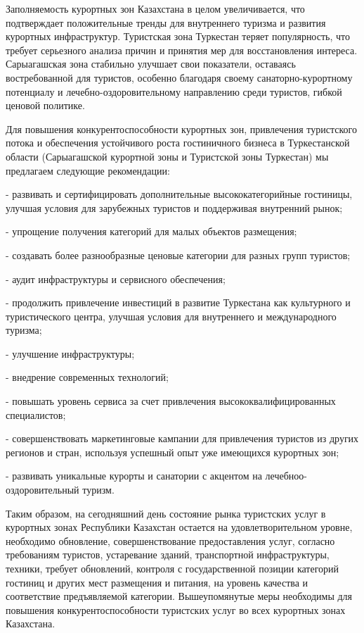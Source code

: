 \begin{multicols}{2}
Заполняемость курортных зон Казахстана в целом увеличивается, что
подтверждает положительные тренды для внутреннего туризма и развития
курортных инфраструктур. Туристская зона Туркестан теряет популярность,
что требует серьезного анализа причин и принятия мер для восстановления
интереса. Сарыагашская зона стабильно улучшает свои показатели,
оставаясь востребованной для туристов, особенно благодаря своему
санаторно-курортному потенциалу и лечебно-оздоровительному направлению
среди туристов, гибкой ценовой политике.

Для повышения конкурентоспособности курортных зон, привлечения
туристского потока и обеспечения устойчивого роста гостиничного бизнеса
в Туркестанской области (Сарыагашской курортной зоны и Туристской зоны
Туркестан) мы предлагаем следующие рекомендации:

- развивать и сертифицировать дополнительные высококатегорийные
гостиницы, улучшая условия для зарубежных туристов и поддерживая
внутренний рынок;

- упрощение получения категорий для малых объектов размещения;

- создавать более разнообразные ценовые категории для разных групп
туристов;

- аудит инфраструктуры и сервисного обеспечения;

- продолжить привлечение инвестиций в развитие Туркестана как
культурного и туристического центра, улучшая условия для внутреннего и
международного туризма;

- улучшение инфраструктуры;

- внедрение современных технологий;

- повышать уровень сервиса за счет привлечения высококвалифицированных
специалистов;

- совершенствовать маркетинговые кампании для привлечения туристов из
других регионов и стран, используя успешный опыт уже имеющихся курортных
зон;

- развивать уникальные курорты и санатории с акцентом на
лечебноо-оздоровительный туризм.

Таким образом, на сегодняшний день состояние рынка туристских услуг в
курортных зонах Республики Казахстан остается на удовлетворительном
уровне, необходимо обновление, совершенствование предоставления услуг,
согласно требованиям туристов, устаревание зданий, транспортной
инфраструктуры, техники, требует обновлений, контроля с государственной
позиции категорий гостиниц и других мест размещения и питания, на
уровень качества и соответствие предъявляемой категории. Вышеупомянутые
меры необходимы для повышения конкурентоспособности туристских услуг во
всех курортных зонах Казахстана.
\end{multicols}

